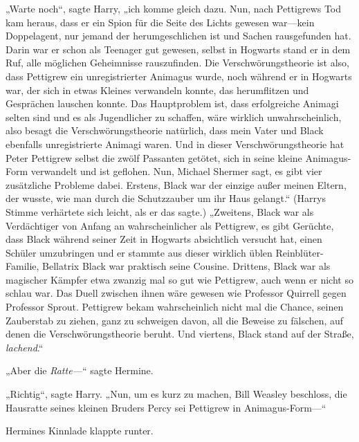 „Warte noch“, sagte Harry, „ich komme gleich dazu. Nun, nach Pettigrews Tod kam heraus, dass er ein Spion für die Seite des Lichts gewesen war—kein Doppelagent, nur jemand der herumgeschlichen ist und Sachen rausgefunden hat. Darin war er schon als Teenager gut gewesen, selbst in Hogwarts stand er in dem Ruf, alle möglichen Geheimnisse rauszufinden. Die Verschwörungstheorie ist also, dass Pettigrew ein unregistrierter Animagus wurde, noch während er in Hogwarts war, der sich in etwas Kleines verwandeln konnte, das herumflitzen und Gesprächen lauschen konnte. Das Hauptproblem ist, dass erfolgreiche Animagi selten sind und es als Jugendlicher zu schaffen, wäre wirklich unwahrscheinlich, also besagt die Verschwörungstheorie natürlich, dass mein Vater und Black ebenfalls unregistrierte Animagi waren. Und in dieser Verschwörungstheorie hat Peter Pettigrew selbst die zwölf Passanten getötet, sich in seine kleine Animagus-Form verwandelt und ist geflohen. Nun, Michael Shermer sagt, es gibt vier zusätzliche Probleme dabei. Erstens, Black war der einzige außer meinen Eltern, der wusste, wie man durch die Schutzzauber um ihr Haus gelangt.“ (Harrys Stimme verhärtete sich leicht, als er das sagte.) „Zweitens, Black war als Verdächtiger von Anfang an wahrscheinlicher als Pettigrew, es gibt Gerüchte, dass Black während seiner Zeit in Hogwarts absichtlich versucht hat, einen Schüler umzubringen und er stammte aus dieser wirklich üblen Reinblüter-Familie, Bellatrix Black war praktisch seine Cousine. Drittens, Black war als magischer Kämpfer etwa zwanzig mal so gut wie Pettigrew, auch wenn er nicht so schlau war. Das Duell zwischen ihnen wäre gewesen wie Professor Quirrell gegen Professor Sprout. Pettigrew bekam wahrscheinlich nicht mal die Chance, seinen Zauberstab zu ziehen, ganz zu schweigen davon, all die Beweise zu fälschen, auf denen die Verschwörungstheorie beruht. Und viertens, Black stand auf der Straße, \emph{lachend}.“

„Aber die \emph{Ratte—}“ sagte Hermine.

„Richtig“, sagte Harry. „Nun, um es kurz zu machen, Bill Weasley beschloss, die Hausratte seines kleinen Bruders Percy sei Pettigrew in Animagus-Form—“

Hermines Kinnlade klappte runter.

